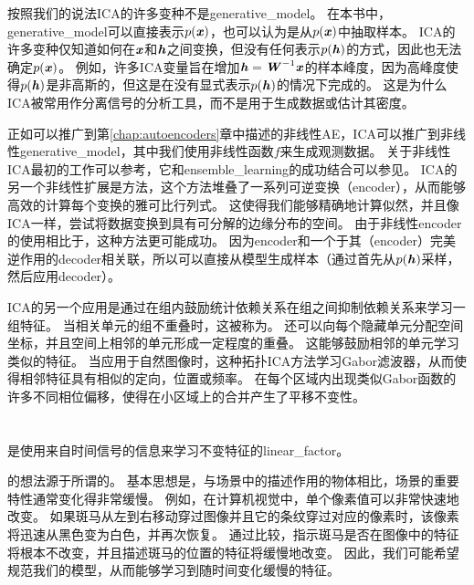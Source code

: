 按照我们的说法\gls{ICA}的许多变种不是\gls{generative_model}。
 在本书中，\gls{generative_model}可以直接表示$p(\boldsymbol{\mathit{x}})$，也可以认为是从$p(\boldsymbol{\mathit{x}})$中抽取样本。
\gls{ICA}的许多变种仅知道如何在$\boldsymbol{\mathit{x}}$和$\boldsymbol{\mathit{h}}$之间变换，但没有任何表示$p(\boldsymbol{\mathit{h}})$的方式，因此也无法确定$p(\boldsymbol{\mathit{x}})$。
例如，许多\gls{ICA}变量旨在增加$\boldsymbol{\mathit{h}} = \boldsymbol{\mathit{W}}^{-1}\boldsymbol{\mathit{x}}$的样本峰度，因为高峰度使得$p(\boldsymbol{\mathit{h}})$是非高斯的，但这是在没有显式表示$p(\boldsymbol{\mathit{h}})$的情况下完成的。
这是为什么\gls{ICA}被常用作分离信号的分析工具，而不是用于生成数据或估计其密度。


正如可以推广到第\ref{chap:autoencoders}章中描述的非线性\gls{AE}，\gls{ICA}可以推广到非线性\gls{generative_model}，其中我们使用非线性函数$f$来生成观测数据。
关于非线性\gls{ICA}最初的工作可以参考\citet{hyvarinen1999nonlinear}，它和\gls{ensemble_learning}的成功结合可以参见\citet{roberts2001independent,lappalainen2000nonlinear}。
\gls{ICA}的另一个非线性扩展是方法\citep{Dinh-et-al-arxiv2014}，这个方法堆叠了一系列可逆变换（\gls{encoder}），从而能够高效的计算每个变换的雅可比行列式。
这使得我们能够精确地计算似然，并且像\gls{ICA}一样，尝试将数据变换到具有可分解的边缘分布的空间。
由于非线性\gls{encoder}的使用相比于，这种方法更可能成功。
因为\gls{encoder}和一个于其（\gls{encoder}）完美逆作用的\gls{decoder}相关联，所以可以直接从模型生成样本（通过首先从$p(\boldsymbol{\mathit{h}})$采样，然后应用\gls{decoder}）。


\gls{ICA}的另一个应用是通过在组内鼓励统计依赖关系在组之间抑制依赖关系来学习一组特征。
当相关单元的组不重叠时，这被称为。
还可以向每个隐藏单元分配空间坐标，并且空间上相邻的单元形成一定程度的重叠。
这能够鼓励相邻的单元学习类似的特征。
当应用于自然图像时，这种拓扑\gls{ICA}方法学习Gabor滤波器，从而使得相邻特征具有相似的定向，位置或频率。
在每个区域内出现类似Gabor函数的许多不同相位偏移，使得在小区域上的合并产生了平移不变性。


\section{}
\label{sec:slow_feature_analysis}


 是使用来自时间信号的信息来学习不变特征的\gls{linear_factor}\citep{WisSej2002}。


的想法源于所谓的。
基本思想是，与场景中的描述作用的物体相比，场景的重要特性通常变化得非常缓慢。
例如，在计算机视觉中，单个像素值可以非常快速地改变。
如果斑马从左到右移动穿过图像并且它的条纹穿过对应的像素时，该像素将迅速从黑色变为白色，并再次恢复。
通过比较，指示斑马是否在图像中的特征将根本不改变，并且描述斑马的位置的特征将缓慢地改变。
因此，我们可能希望规范我们的模型，从而能够学习到随时间变化缓慢的特征。


